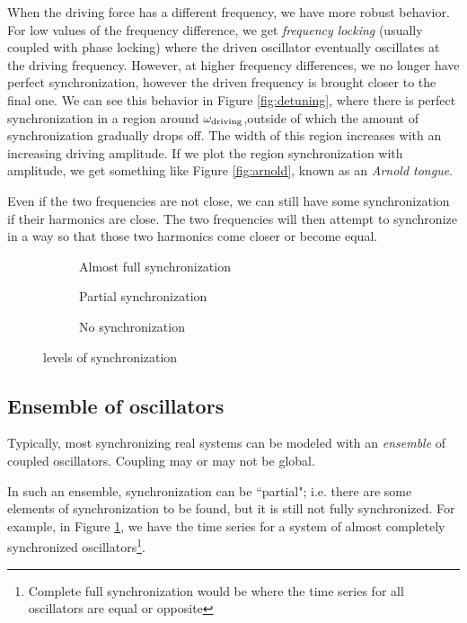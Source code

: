 \documentclass[12pt]{article}
\begin{document}
When the driving force has a different frequency, we have more robust behavior. For low values of the frequency difference, we get \emph{frequency locking} (usually coupled with phase locking) where the driven oscillator eventually oscillates at the driving frequency. However, at higher frequency differences, we no longer have perfect synchronization, however the driven frequency is brought closer to the final one. We can see this behavior in Figure \ref{fig:detuning}, where there is perfect synchronization in a region around $\omega_{\rm driving}$,outside of which the amount of synchronization gradually drops off. The width of this region increases with an increasing driving amplitude. If we plot the region synchronization with amplitude, we get something like Figure \ref{fig:arnold}, known as an \emph{Arnold tongue}\cite{pikovsky2001synchronization}.

Even if the two frequencies are not close, we can still have some synchronization if their harmonics are close. The two frequencies will then attempt to synchronize in a way so that those two harmonics come closer or become equal.
\begin{figure}
\centering
\begin{subfigure}[b]{0.4\textwidth}
\centering

\caption{Almost full synchronization}\label{fig:fullgraph}
\end{subfigure}
\begin{subfigure}[b]{0.4\textwidth}
\centering

\caption{Partial synchronization}\label{fig:partialgraph}
\end{subfigure}

\centering
\begin{subfigure}[b]{0.4\textwidth}
\centering

\caption{No synchronization}\label{fig:nograph}
\end{subfigure}
\caption{levels of synchronization}
\end{figure}

\subsection{Ensemble of oscillators}

Typically, most synchronizing real systems can be modeled with an \emph{ensemble} of coupled oscillators. Coupling may or may not be global.


In such an ensemble, synchronization can be ``partial"; i.e. there are some elements of synchronization to be found, but it is still not fully synchronized. For example, in Figure \ref{fig:fullgraph}, we have the time series for a system of almost completely synchronized oscillators\footnote{Complete full synchronization would be where the time series for all oscillators are equal or opposite}.
\end{document}
